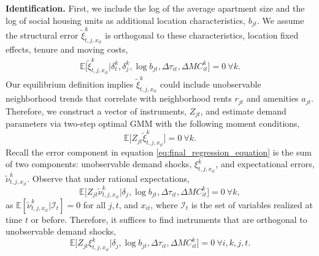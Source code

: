 \documentclass[11pt]{article}
\newcommand{\E}{\mathbb{E}}
\newcommand{\Paragraph}{\vspace{0.1cm}\noindent\textbf}
\begin{document}
\Paragraph{Identification.} First, we include the log of the average apartment size and the log of social housing units as additional location characteristics, $b_{jt}$. We assume the structural error $\tilde{\xi}^k_{t,j,x_{it}}$ is orthogonal to these characteristics, location fixed effects, tenure and moving costs,
\begin{align*}
    \E\big[ \tilde{\xi}^k_{t,j,x_{it}} | \delta^k_t, \delta^k_j , \log b_{jt},\Delta{\tau}_{it}, \Delta{MC}^k_{it}\big] =0 \ \forall k.
\end{align*}
Our equilibrium definition implies $\tilde{\xi}^k_{t,j,x_{it}}$ could include unobservable neighborhood trends that correlate with neighborhood rents $r_{jt}$ and amenities $a_{jt}$. Therefore, we construct a vector of instruments, $Z_{jt}$, and estimate demand parameters via two-step optimal GMM with the following moment conditions,
\[ \E\big[ Z_{jt}\tilde{\xi}^k_{t,j,x_{it}} \big] =0 \ \forall k.\] 
Recall the error component in equation \eqref{eq:final_regression_equation} is the sum of two components: unobservable demand shocks, ${\xi}^k_{t,j,x_{it}}$, and expectational errors, $\tilde{\nu}^k_{t,j,x_{it}}$. Observe that under rational expectations,
\[ \E\big[ Z_{jt} \tilde{\nu}^k_{t,j,x_{it}} | \delta_j , \log b_{jt},  \Delta{\tau}_{it},\Delta{MC}^k_{it}\big] =0 \ \forall k,\] 
as $\E[\tilde{\nu}^k_{t,j,x_{it}}|\mathcal{I}_{t}]= 0$ for all $j, t$, and $x_{it}$, where $\mathcal{I}_{t}$ is the set of variables realized at time $t$ or before. Therefore, it suffices to find instruments that are orthogonal to unobservable demand shocks,
\[ \E\big[ Z_{jt}\xi^k_{t,j,x_{it}} | \delta_j,\log b_{jt},  \Delta{\tau}_{it},\Delta{MC}^k_{it} \big] =0 \ \forall i,k,j,t.\] 
\end{document}
